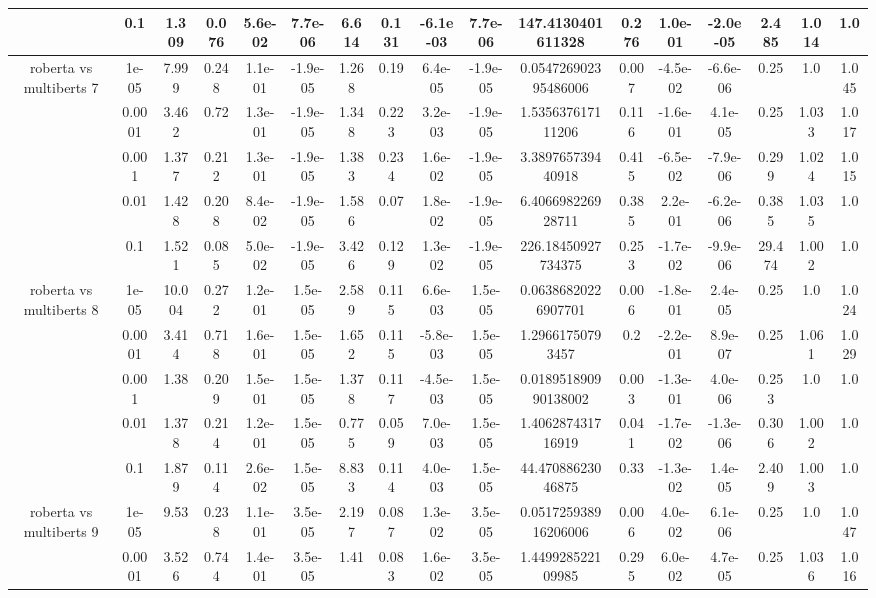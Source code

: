 \begin{tabular}{|c|c|c|c|c|c|c|c|c|c|c|c|c|c|c|c|c|}
 & 0.1 & 1.309 & 0.076 & 5.6e-02 & 7.7e-06 & 6.614 & 0.131 & -6.1e-03 & 7.7e-06 & 147.4130401611328 & 0.276 & 1.0e-01 & -2.0e-05 & 2.485 & 1.014 & 1.0 \\
\hline
\multirow{5}{*}{roberta  vs multiberts 7} & 1e-05 & 7.999 & 0.248 & 1.1e-01 & -1.9e-05 & 1.268 & 0.19 & 6.4e-05 & -1.9e-05 & 0.054726902395486006 & 0.007 & -4.5e-02 & -6.6e-06 & 0.25 & 1.0 & 1.045 \\
 & 0.0001 & 3.462 & 0.72 & 1.3e-01 & -1.9e-05 & 1.348 & 0.223 & 3.2e-03 & -1.9e-05 & 1.535637617111206 & 0.116 & -1.6e-01 & 4.1e-05 & 0.25 & 1.033 & 1.017 \\
 & 0.001 & 1.377 & 0.212 & 1.3e-01 & -1.9e-05 & 1.383 & 0.234 & 1.6e-02 & -1.9e-05 & 3.389765739440918 & 0.415 & -6.5e-02 & -7.9e-06 & 0.299 & 1.024 & 1.015 \\
 & 0.01 & 1.428 & 0.208 & 8.4e-02 & -1.9e-05 & 1.586 & 0.07 & 1.8e-02 & -1.9e-05 & 6.406698226928711 & 0.385 & 2.2e-01 & -6.2e-06 & 0.385 & 1.035 & 1.0 \\
 & 0.1 & 1.521 & 0.085 & 5.0e-02 & -1.9e-05 & 3.426 & 0.129 & 1.3e-02 & -1.9e-05 & 226.18450927734375 & 0.253 & -1.7e-02 & -9.9e-06 & 29.474 & 1.002 & 1.0 \\
\hline
\multirow{5}{*}{roberta  vs multiberts 8} & 1e-05 & 10.004 & 0.272 & 1.2e-01 & 1.5e-05 & 2.589 & 0.115 & 6.6e-03 & 1.5e-05 & 0.06386820226907701 & 0.006 & -1.8e-01 & 2.4e-05 & 0.25 & 1.0 & 1.024 \\
 & 0.0001 & 3.414 & 0.718 & 1.6e-01 & 1.5e-05 & 1.652 & 0.115 & -5.8e-03 & 1.5e-05 & 1.29661750793457 & 0.2 & -2.2e-01 & 8.9e-07 & 0.25 & 1.061 & 1.029 \\
 & 0.001 & 1.38 & 0.209 & 1.5e-01 & 1.5e-05 & 1.378 & 0.117 & -4.5e-03 & 1.5e-05 & 0.018951890990138002 & 0.003 & -1.3e-01 & 4.0e-06 & 0.253 & 1.0 & 1.0 \\
 & 0.01 & 1.378 & 0.214 & 1.2e-01 & 1.5e-05 & 0.775 & 0.059 & 7.0e-03 & 1.5e-05 & 1.406287431716919 & 0.041 & -1.7e-02 & -1.3e-06 & 0.306 & 1.002 & 1.0 \\
 & 0.1 & 1.879 & 0.114 & 2.6e-02 & 1.5e-05 & 8.833 & 0.114 & 4.0e-03 & 1.5e-05 & 44.47088623046875 & 0.33 & -1.3e-02 & 1.4e-05 & 2.409 & 1.003 & 1.0 \\
\hline
\multirow{5}{*}{roberta  vs multiberts 9} & 1e-05 & 9.53 & 0.238 & 1.1e-01 & 3.5e-05 & 2.197 & 0.087 & 1.3e-02 & 3.5e-05 & 0.051725938916206006 & 0.006 & 4.0e-02 & 6.1e-06 & 0.25 & 1.0 & 1.047 \\
 & 0.0001 & 3.526 & 0.744 & 1.4e-01 & 3.5e-05 & 1.41 & 0.083 & 1.6e-02 & 3.5e-05 & 1.449928522109985 & 0.295 & 6.0e-02 & 4.7e-05 & 0.25 & 1.036 & 1.016 \\

\end{tabular}

